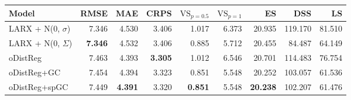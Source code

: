 \begin{tabular}{lrrrrrrrr}
\toprule
Model & RMSE & MAE & CRPS & $\text{VS}_{p=0.5}$ & $\text{VS}_{p=1}$ & ES & DSS & LS \\
\midrule
LARX + N(0, $\sigma$) & {\cellcolor[HTML]{30123B}} \color[HTML]{F1F1F1} 7.346 & {\cellcolor[HTML]{458AFC}} \color[HTML]{F1F1F1} 4.530 & {\cellcolor[HTML]{4682F8}} \color[HTML]{F1F1F1} 3.406 & {\cellcolor[HTML]{7A0403}} \color[HTML]{F1F1F1} 1.017 & {\cellcolor[HTML]{E4450A}} \color[HTML]{F1F1F1} 6.373 & {\cellcolor[HTML]{448FFE}} \color[HTML]{F1F1F1} 20.935 & {\cellcolor[HTML]{FABA39}} \color[HTML]{000000} 119.170 & {\cellcolor[HTML]{7A0403}} \color[HTML]{F1F1F1} 81.510 \\
LARX + N(0, $\Sigma$) & {\cellcolor[HTML]{30123B}} \color[HTML]{F1F1F1} \bfseries 7.346 & {\cellcolor[HTML]{458CFD}} \color[HTML]{F1F1F1} 4.532 & {\cellcolor[HTML]{4682F8}} \color[HTML]{F1F1F1} 3.406 & {\cellcolor[HTML]{3BA0FD}} \color[HTML]{F1F1F1} 0.885 & {\cellcolor[HTML]{3D9EFE}} \color[HTML]{F1F1F1} 5.712 & {\cellcolor[HTML]{3F3B97}} \color[HTML]{F1F1F1} 20.455 & {\cellcolor[HTML]{3E3891}} \color[HTML]{F1F1F1} 84.487 & {\cellcolor[HTML]{1CE6B4}} \color[HTML]{000000} 64.149 \\
oDistReg & {\cellcolor[HTML]{4249B1}} \color[HTML]{F1F1F1} 7.463 & {\cellcolor[HTML]{30123B}} \color[HTML]{F1F1F1} 4.393 & {\cellcolor[HTML]{30123B}} \color[HTML]{F1F1F1} \bfseries 3.305 & {\cellcolor[HTML]{920B01}} \color[HTML]{F1F1F1} 1.012 & {\cellcolor[HTML]{7A0403}} \color[HTML]{F1F1F1} 6.546 & {\cellcolor[HTML]{4669E0}} \color[HTML]{F1F1F1} 20.701 & {\cellcolor[HTML]{D9E436}} \color[HTML]{000000} 114.483 & {\cellcolor[HTML]{EA4E0D}} \color[HTML]{F1F1F1} 76.754 \\
oDistReg+GC & {\cellcolor[HTML]{4146AC}} \color[HTML]{F1F1F1} 7.454 & {\cellcolor[HTML]{30123B}} \color[HTML]{F1F1F1} 4.394 & {\cellcolor[HTML]{38276D}} \color[HTML]{F1F1F1} 3.323 & {\cellcolor[HTML]{30123B}} \color[HTML]{F1F1F1} 0.851 & {\cellcolor[HTML]{3D358B}} \color[HTML]{F1F1F1} 5.548 & {\cellcolor[HTML]{30123B}} \color[HTML]{F1F1F1} 20.252 & {\cellcolor[HTML]{35F394}} \color[HTML]{000000} 103.057 & {\cellcolor[HTML]{2FB2F4}} \color[HTML]{F1F1F1} 61.536 \\
oDistReg+spGC & {\cellcolor[HTML]{4143A7}} \color[HTML]{F1F1F1} 7.449 & {\cellcolor[HTML]{30123B}} \color[HTML]{F1F1F1} \bfseries 4.391 & {\cellcolor[HTML]{372466}} \color[HTML]{F1F1F1} 3.320 & {\cellcolor[HTML]{30123B}} \color[HTML]{F1F1F1} \bfseries 0.851 & {\cellcolor[HTML]{3D358B}} \color[HTML]{F1F1F1} 5.548 & {\cellcolor[HTML]{30123B}} \color[HTML]{F1F1F1} \bfseries 20.238 & {\cellcolor[HTML]{2AEFA1}} \color[HTML]{000000} 102.207 & {\cellcolor[HTML]{31AFF5}} \color[HTML]{F1F1F1} 61.476 \\

\end{tabular}
